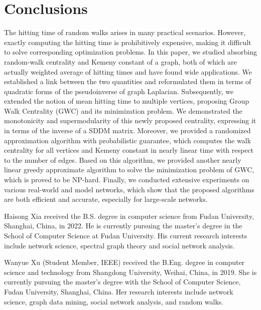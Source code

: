 \documentclass[10pt,twocolumn,twoside]{IEEEtran}
\newcommand{\biophoto}[1]{\texttt{[image: \#1]}}
\begin{document}
\section{Conclusions}

The hitting time of random walks arises in many practical scenarios.
However, exactly computing the hitting time is prohibitively expensive, making it difficult to solve corresponding optimization problems.
In this paper, we studied absorbing random-walk centrality and Kemeny constant of a graph, both of which are actually weighted average of hitting times and have found wide applications.
We established a link between the two quantities and reformulated them in terms of quadratic forms of the pseudoinverse of graph Laplacian.
Subsequently, we extended the notion of mean hitting time to multiple vertices, proposing Group Walk Centrality (GWC) and its minimization problem.
We demonstrated the monotonicity and supermodularity of this newly proposed centrality, expressing it in terms of the inverse of a SDDM matrix.
Moreover, we provided a randomized approximation algorithm with probabilistic guarantee, which computes the walk centrality for all vertices and Kemeny constant in nearly linear time with respect to the number of edges.
Based on this algorithm, we provided another nearly linear greedy approximate algorithm to solve the minimization problem of GWC, which is proved to be NP-hard.
Finally, we conducted extensive experiments on various real-world and model networks, which show that the proposed algorithms are both efficient and accurate, especially for large-scale networks.


\balance

\begin{IEEEbiographynophoto}{Haisong Xia}
    received the B.S. degree in computer science from Fudan University, Shanghai, China, in 2022. He is currently pursuing the master's degree in the School of Computer Science at Fudan University.
    His current research interests include network science, spectral graph theory and social network analysis.
\end{IEEEbiographynophoto}

\begin{IEEEbiographynophoto}{Wanyue Xu}
    (Student Member, IEEE) received the B.Eng. degree in computer science and technology from Shangdong University, Weihai, China, in 2019. She is currently pursuing the master's degree with the School of Computer Science, Fudan University, Shanghai, China.
    Her research interests include network science, graph data mining, social network analysis, and random walks.
\end{IEEEbiographynophoto}
\end{document}
